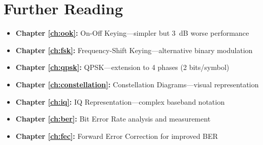 \section{Further Reading}

\begin{itemize}
\item \textbf{Chapter \ref{ch:ook}:} On-Off Keying---simpler but 3~dB worse performance
\item \textbf{Chapter \ref{ch:fsk}:} Frequency-Shift Keying---alternative binary modulation
\item \textbf{Chapter \ref{ch:qpsk}:} QPSK---extension to 4 phases (2 bits/symbol)
\item \textbf{Chapter \ref{ch:constellation}:} Constellation Diagrams---visual representation
\item \textbf{Chapter \ref{ch:iq}:} IQ Representation---complex baseband notation
\item \textbf{Chapter \ref{ch:ber}:} Bit Error Rate analysis and measurement
\item \textbf{Chapter \ref{ch:fec}:} Forward Error Correction for improved BER
\end{itemize}
